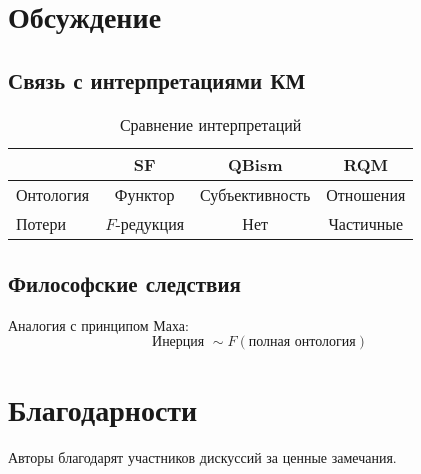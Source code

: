 \documentclass[12pt, a4paper]{article}
\begin{document}
\section{Обсуждение}

\subsection{Связь с интерпретациями КМ}

\begin{table}[h]
\centering
\begin{tabular}{|l|c|c|c|}
\hline
 & SF & QBism & RQM \\
\hline
Онтология & Функтор & Субъективность & Отношения \\
\hline
Потери & $F$-редукция & Нет & Частичные \\
\hline
\end{tabular}
\caption{Сравнение интерпретаций}
\end{table}

\subsection{Философские следствия}

Аналогия с принципом Маха:
\begin{equation}
\text{Инерция } \sim F(\text{полная онтология})
\end{equation}

\section*{Благодарности}
Авторы благодарят участников дискуссий за ценные замечания.



\end{document}
